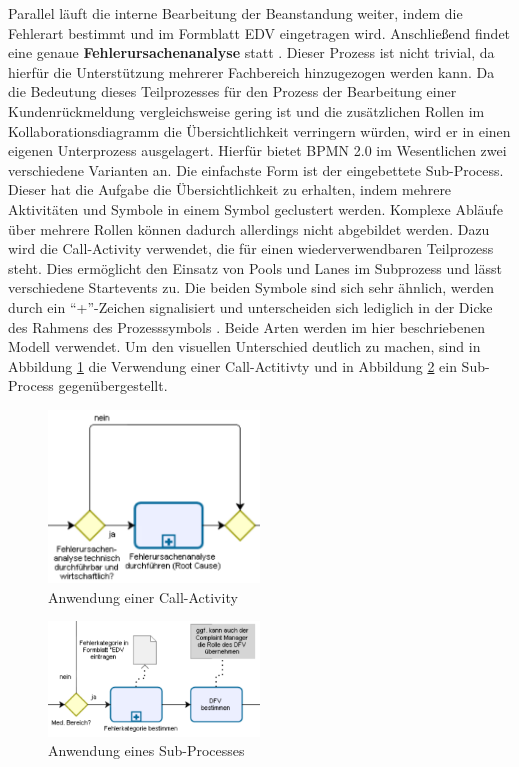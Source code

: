 \documentclass[a4paper,12pt]{report}
\begin{document}
Parallel läuft die interne Bearbeitung der Beanstandung weiter, indem die Fehlerart bestimmt und im Formblatt EDV eingetragen wird. Anschließend findet eine genaue \textbf{Fehlerursachenanalyse} statt . Dieser Prozess ist nicht trivial, da hierfür die Unterstützung mehrerer Fachbereich hinzugezogen werden kann. Da die Bedeutung dieses Teilprozesses für den Prozess der Bearbeitung einer Kundenrückmeldung vergleichsweise gering ist und die zusätzlichen Rollen im Kollaborationsdiagramm die Übersichtlichkeit verringern würden, wird er in einen eigenen Unterprozess ausgelagert. Hierfür bietet BPMN 2.0 im Wesentlichen zwei verschiedene Varianten an. Die einfachste Form ist der eingebettete Sub-Process. Dieser hat die Aufgabe die Übersichtlichkeit zu erhalten, indem mehrere Aktivitäten und Symbole in einem Symbol geclustert werden. Komplexe Abläufe über mehrere Rollen können dadurch allerdings nicht abgebildet werden. Dazu wird die Call-Activity verwendet, die für einen wiederverwendbaren Teilprozess steht. Dies ermöglicht den Einsatz von Pools und Lanes im Subprozess und lässt verschiedene Startevents zu. Die beiden Symbole sind sich sehr ähnlich, werden durch ein "`+"'-Zeichen signalisiert und unterscheiden sich lediglich in der Dicke des Rahmens des Prozesssymbols \citep[vgl.][S. 173-188]{OMG2011}. Beide Arten werden im hier beschriebenen Modell verwendet. Um den visuellen Unterschied deutlich zu machen, sind in Abbildung \ref{call_activity} die Verwendung einer Call-Actitivty und in Abbildung \ref{sub_process} ein Sub-Process gegenübergestellt.
\begin{figure}[ht]
\centering
\includegraphics[width=0.5\textwidth]{Images/sub_process_call}
\caption[Anwendung einer Call Activity]{Anwendung einer Call-Activity}
\label{call_activity}
\end{figure}
\begin{figure}[ht]
\centering
\includegraphics[width=0.5\textwidth]{Images/sub_process}
\caption[Anwendung eines Sub-Processes]{Anwendung eines Sub-Processes}
\label{sub_process}
\end{figure}
\end{document}
